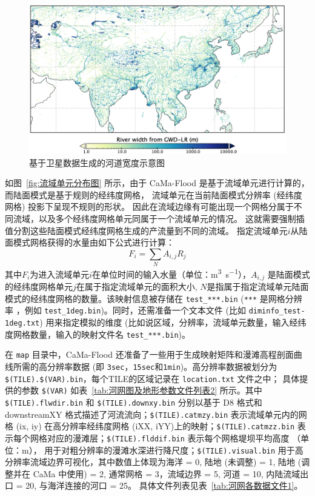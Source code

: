 {
  \begin{figure}[htbp]
    \centering
    \includegraphics[width=1.0\textwidth]{Figures/陆地表面的水分循环/基于卫星数据生成的河道宽度示意图.png}
    \caption{基于卫星数据生成的河道宽度示意图}
    \label{fig:基于卫星数据生成的河道宽度示意图}
  \end{figure}
}

如图~\ref{fig:流域单元分布图} 所示，由于 CaMa-Flood 是基于流域单元进行计算的，而陆面模式是基于规则的经纬度网格，
流域单元在当前陆面模式分辨率 (经纬度网格) 投影下呈现不规则的形状。
因此在流域边缘有可能出现一个网格分属于不同流域，以及多个经纬度网格单元同属于一个流域单元的情况。
这就需要强制插值分割这些陆面模式经纬度网格生成的产流量到不同的流域。
指定流域单元$i$从陆面模式网格获得的水量由如下公式进行计算：
\begin{equation}
  F_{i}=\sum_{N} A_{i, j} R_{j}
\end{equation}
其中$F_i$为进入流域单元$i$在单位时间的输入水量（单位：\unit{m^3.s^{-1}}），$A_{i, j}$ 是陆面模式的经纬度网格单元$j$在属于指定流域单元的面积大小,
$N$是指属于指定流域单元陆面模式的经纬度网格的数量。该映射信息被存储在 \texttt{test\_***.bin} (\texttt{***} 是网格分辨率
，例如 \texttt{test\_1deg.bin})。同时，还需准备一个文本文件 (比如 \texttt{diminfo\_test-1deg.txt}) 用来指定模拟的维度
(比如说区域，分辨率，流域单元数量，输入经纬度网格数量，输入的映射文件名 \texttt{test\_***.bin})。

在 \texttt{map} 目录中，CaMa-Flood 还准备了一些用于生成映射矩阵和漫滩高程剖面曲线所需的高分辨率数据 (即 \texttt{3sec}，\texttt{15sec}和\texttt{1min})。高分辨率数据被划分为\texttt{\$(TILE).\$(VAR)\allowbreak.bin}，每个TILE的区域记录在 \texttt{location.txt} 文件之中；
具体提供的参数 \texttt{\$(VAR)} 如表~\ref{tab:河网图及地形参数文件列表2} 所示。其中 \texttt{\$(TILE).flwdir.bin} 和
\texttt{\$(TILE).downxy.bin} 分别以基于 D8 格式和 downstreamXY 格式描述了河流流向；\texttt{\$(TILE).catmzy.bin} 表示流域单元内的网格 (ix, iy) 
在高分辨率经纬度网格 (iXX, iYY)上的映射；\texttt{\$(TILE).catmzz.bin} 表示每个网格对应的漫滩层；\texttt{\$(TILE).flddif.bin} 表示每个网格堤坝平均高度 （单位：m），
用于对粗分辨率的漫滩水深进行降尺度；\texttt{\$(TILE).visual.bin} 用于高分辨率流域边界可视化，其中数值上体现为海洋 = 0, 
陆地 (未调整) = 1, 陆地 (调整并在 CaMa 中使用) = 2, 通常网格 = 3，流域边界 = 5, 河道 = 10, 内陆流域出口 = 20, 与海洋连接的河口 = 25。
具体文件列表见表~\ref{tab:河网各数据文件1}。

